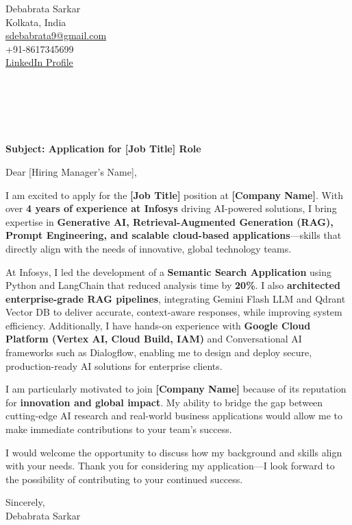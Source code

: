 \documentclass[a4paper,11pt]{article}
\begin{document}
\begin{flushright}
Debabrata Sarkar \\
Kolkata, India \\
\href{mailto:sdebabrata9@gmail.com}{sdebabrata9@gmail.com} \\
+91-8617345699 \\
\href{https://www.linkedin.com/in/debabrata-sarkar-ba555b338/}{LinkedIn Profile} \\
\end{flushright}

\vspace{1cm}

\begin{flushleft}
 \\
[Company Name] \\
[Company Address] \\
[City, Country] \\
\end{flushleft}

\vspace{0.5cm}

\textbf{Subject: Application for [Job Title] Role}

\vspace{0.5cm}

Dear [Hiring Manager’s Name],

I am excited to apply for the \textbf{[Job Title]} position at \textbf{[Company Name]}. With over \textbf{4 years of experience at Infosys} driving AI-powered solutions, I bring expertise in \textbf{Generative AI, Retrieval-Augmented Generation (RAG), Prompt Engineering, and scalable cloud-based applications}—skills that directly align with the needs of innovative, global technology teams.

At Infosys, I led the development of a \textbf{Semantic Search Application} using Python and LangChain that reduced analysis time by \textbf{20\%}. I also \textbf{architected enterprise-grade RAG pipelines}, integrating Gemini Flash LLM and Qdrant Vector DB to deliver accurate, context-aware responses, while improving system efficiency. Additionally, I have hands-on experience with \textbf{Google Cloud Platform (Vertex AI, Cloud Build, IAM)} and Conversational AI frameworks such as Dialogflow, enabling me to design and deploy secure, production-ready AI solutions for enterprise clients.

I am particularly motivated to join \textbf{[Company Name]} because of its reputation for \textbf{innovation and global impact}. My ability to bridge the gap between cutting-edge AI research and real-world business applications would allow me to make immediate contributions to your team’s success.

I would welcome the opportunity to discuss how my background and skills align with your needs. Thank you for considering my application—I look forward to the possibility of contributing to your continued success.

\vspace{0.5cm}

Sincerely, \\
Debabrata Sarkar
\end{document}
